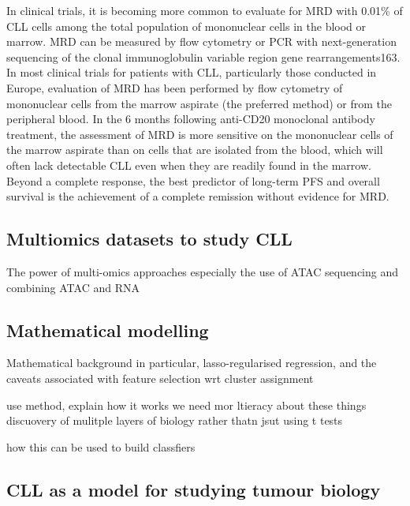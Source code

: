 \documentclass[11pt, a4paper, twosided]{book}
\begin{document}
In clinical trials, it is becoming more common to evaluate for MRD with 0.01\% of CLL cells among the total population of mononuclear cells in the blood or marrow. MRD can be measured by flow cytometry or PCR with next-generation sequencing of the clonal immunoglobulin variable region gene rearrangements163. In most clinical trials for patients with CLL, particularly those conducted in Europe, evaluation of MRD has been performed by flow cytometry of mononuclear cells from the marrow aspirate (the preferred method) or from the peripheral blood. In the 6 months following anti-CD20 monoclonal antibody treatment, the assessment of MRD is more sensitive on the mononuclear cells of the marrow aspirate than on cells that are isolated from the blood, which will often lack detectable CLL even when they are readily found in the marrow. Beyond a complete response, the best predictor of long-term PFS and overall survival is the achievement of a complete remission without evidence for MRD.

\hypertarget{multiomics-datasets-to-study-cll}{%
\subsection{Multiomics datasets to study CLL}\label{multiomics-datasets-to-study-cll}}

The power of multi-omics approaches especially the use of ATAC sequencing and combining ATAC and RNA

\hypertarget{intro-multivariate-modelling}{%
\subsection{Mathematical modelling}\label{intro-multivariate-modelling}}

Mathematical background in particular, lasso-regularised regression, and the caveats associated with feature selection
wrt cluster assignment

use method, explain how it works
we need mor ltieracy about these things
discuovery of mulitple layers of biology rather thatn jsut using t tests

how this can be used to build classfiers

\hypertarget{cll-as-a-model-for-studying-tumour-biology}{%
\subsection{CLL as a model for studying tumour biology}\label{cll-as-a-model-for-studying-tumour-biology}}
\end{document}
